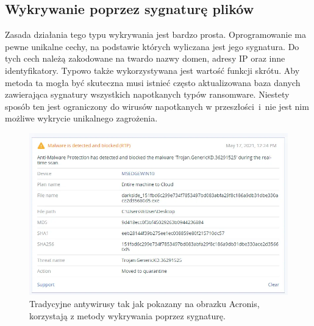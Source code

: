 \subsection{Wykrywanie poprzez sygnaturę plików}
Zasada działania tego typu wykrywania jest bardzo prosta. Oprogramowanie ma pewne unikalne cechy, na podstawie których wyliczana jest jego sygnatura. Do tych cech należą zakodowane na twardo nazwy domen, adresy 
IP oraz inne identyfikatory. Typowo także wykorzystywana jest wartość funkcji skrótu. Aby metoda ta mogła być skuteczna musi istnieć często aktualizowana baza danych zawierająca sygnatury wszystkich napotkanych 
typów ransomware. Niestety sposób ten jest ograniczony do wirusów napotkanych w przeszłości~i~nie jest nim możliwe wykrycie unikalnego zagrożenia.
\begin{figure}[H]
    \centering
    \includegraphics[width=0.65\linewidth]{rysunki/sygnatura.png}
    \caption{Tradycyjne antywirusy tak jak pokazany na obrazku Acronis, korzystają z metody wykrywania poprzez sygnaturę\protect\footnotemark.}
    \label{fig:enter-label}
\end{figure}
